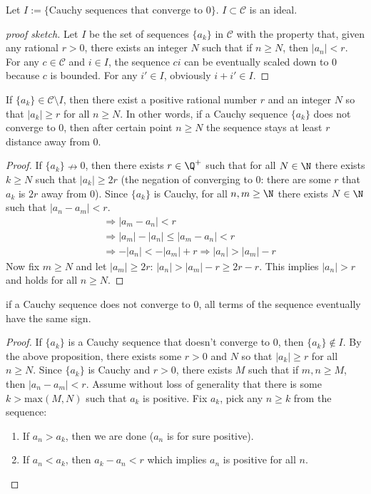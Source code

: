 \documentclass[10pt]{article}
\begin{document}
\begin{proposition}
    Let $I := \{\text{Cauchy sequences that converge to }0\}$. $I\subset \mathcal C$ is an ideal.
\end{proposition}
\begin{proof}[proof sketch]
    Let $I$ be the set of sequences $\{a_k\}$ in $\mathcal C$ with the property that, given any rational $r > 0$, there exists an integer $N$ such that if $n \geq N$, then $|a_n| < r$. For any $c\in \mathcal{C}$ and $i\in I$, the sequence $ci$ can be eventually scaled down to 0 because $c$ is bounded. For any $i'\in I$, obviously $i+i'\in I$.
\end{proof}
\begin{proposition}
    If $\{a_k\}\in \mathcal{C} \setminus I$, then there exist a positive rational number $r$ and an integer $N$ so that $|a_k|\geq r$ for all $n\geq N$. In other words, if a Cauchy sequence $\{a_k\}$ does not converge to 0, then after certain point $n\geq N$ the sequence stays at least $r$ distance away from 0.
\end{proposition}
\begin{proof}
    If $\{a_k\}\nrightarrow 0$, then there exists $ r \in \Q^+$ such that for all $ N \in \N$ there exists $ k\geq N$ such that $|a_k| \geq 2r$ (the negation of converging to 0: there are some $r$ that $a_k$ is $2r$ away from 0). Since $\{a_k\}$ is Cauchy, for all $n, m \geq \N$ there exists $N \in \N$ such that $|a_n - a_m| < r$.
    \begin{align*}
        &\Rightarrow |a_m - a_n| < r\tag{ property of absolute value}\\
        &\Rightarrow |a_m|-|a_n|\leq |a_m - a_n| < r\tag{reverse triangle inequality}\\
        &\Rightarrow -|a_n|<-|a_m|+r \Rightarrow |a_n|>|a_m|-r
    \end{align*}
    Now fix $m \geq N$ and let $|a_m|\geq 2r$: $|a_n|>|a_m|-r\geq 2r-r$. This implies $|a_n|>r$ and holds for all $n\geq N$.
\end{proof}
\begin{corollary}
    if a Cauchy sequence does not converge to 0, all terms of the sequence eventually have the same sign.
\end{corollary}
\begin{proof}
    If $\{a_k\}$ is a Cauchy sequence that doesn't converge to 0, then $\{a_k\}\notin I$. By the above proposition, there exists some $ r>0$ and $N$ so that $| a_k|\geq r$ for all $n\geq N$. Since $\{a_k\}$ is Cauchy and $r>0$, there exists $M$ such that if $m,n \geq M$, then $| a_n-a_m|< r$. Assume without loss of generality that there is some $k>\text{max} (M,N)$ such that $a_k$ is positive. Fix $a_k$, pick any $n\geq k$ from the sequence:
    \begin{enumerate}
        \item[\circled{1}] If $a_n>a_k$, then we are done ($a_n$ is for sure positive).
        \item[\circled{2}] If $a_n<a_k$, then $a_k-a_n<r$ which implies $a_n$ is positive for all $n$.
    \end{enumerate}
\end{proof}
\end{document}

